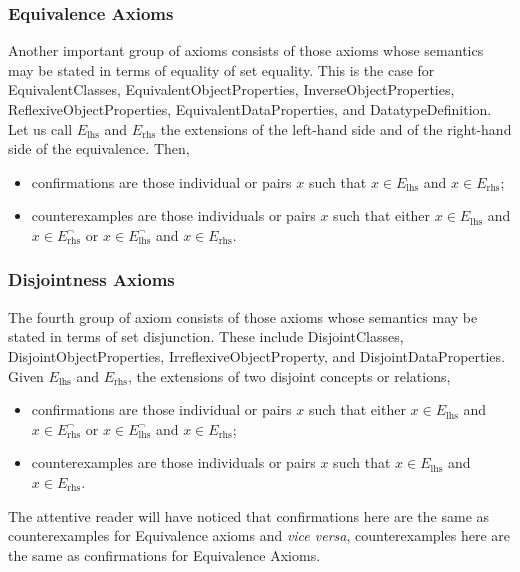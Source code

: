 \documentclass[a4paper]{article}
\newcounter{ex}
\begin{document}
\subsubsection{Equivalence Axioms}

Another important group of axioms consists of those axioms whose semantics may be
stated in terms of equality of set equality. This is the case for
\textsf{EquivalentClasses}, \textsf{EquivalentObjectProperties},
\textsf{InverseObjectProperties}, \textsf{ReflexiveObjectProperties},
\textsf{EquivalentDataProperties}, and \textsf{DatatypeDefinition}.
Let us call $E_\mathrm{lhs}$ and $E_\mathrm{rhs}$ the extensions of the
left-hand side and of the right-hand side of the equivalence. Then, 
\begin{itemize}
\item confirmations are those individual or pairs $x$ such that
  $x \in E_\mathrm{lhs}$ and $x \in E_\mathrm{rhs}$;
\item counterexamples are those individuals or pairs $x$ such that either
  $x \in E_\mathrm{lhs}$ and $x \in E_\mathrm{rhs}^\neg$ or
  $x \in E_\mathrm{lhs}^\neg$ and $x \in E_\mathrm{rhs}$.
\end{itemize}

\subsubsection{Disjointness Axioms}

The fourth group of axiom consists of those axioms whose semantics may be stated
in terms of set disjunction. These include
\textsf{DisjointClasses}, \textsf{DisjointObjectProperties},
\textsf{IrreflexiveObjectProperty}, and \textsf{DisjointDataProperties}.
Given $E_\mathrm{lhs}$ and $E_\mathrm{rhs}$, the extensions of two
disjoint concepts or relations, 
\begin{itemize}
\item confirmations are those individual or pairs $x$ such that
  either $x \in E_\mathrm{lhs}$ and $x \in E_\mathrm{rhs}^\neg$ or
  $x \in E_\mathrm{lhs}^\neg$ and $x \in E_\mathrm{rhs}$;
\item counterexamples are those individuals or pairs $x$ such that
  $x \in E_\mathrm{lhs}$ and $x \in E_\mathrm{rhs}$.
\end{itemize}
The attentive reader will have noticed that confirmations here are the same
as counterexamples for Equivalence axioms and \emph{vice versa}, counterexamples
here are the same as confirmations for Equivalence Axioms.
\end{document}
